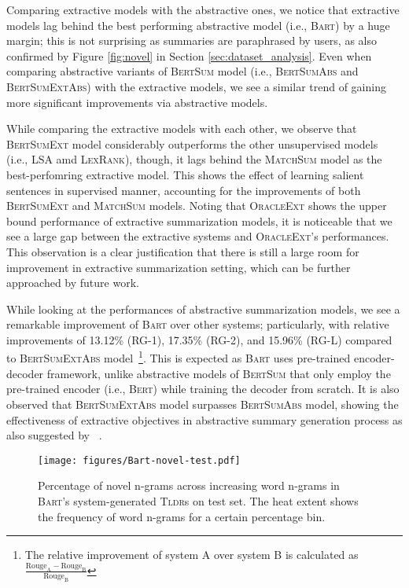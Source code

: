 \documentclass[10pt, a4paper]{article}
\newcommand{\bart}{\textsc{Bart}}
\newcommand{\tldr}{\textsc{Tldr}}
\begin{document}
Comparing extractive models with the abstractive ones, we notice that extractive models lag behind the best performing abstractive model (i.e., \bart) by a huge margin;
this is not surprising as summaries are paraphrased by users, 
as also confirmed by Figure \ref{fig:novel} in Section \ref{sec:dataset_analysis}.  Even when comparing abstractive variants of \textsc{BertSum} model (i.e., \textsc{BertSumAbs} and \textsc{BertSumExtAbs}) with the extractive models, we see a similar trend of gaining more significant improvements via abstractive models. 

While comparing the extractive models with each other, we observe that \textsc{BertSumExt} model considerably outperforms the other unsupervised models (i.e., \textsc{LSA} amd \textsc{LexRank}), though, it lags behind the \textsc{MatchSum} model as the best-perfomring extractive model. This shows the effect of learning salient sentences in supervised manner, accounting for the improvements of both \textsc{BertSumExt} and \textsc{MatchSum} models. Noting that \textsc{OracleExt}
shows the upper bound performance of extractive summarization models, it is noticeable that we see a large gap between the extractive systems and \textsc{OracleExt}'s performances. This observation is a clear justification that there is still a large room for improvement in extractive summarization setting, which can be further approached by future work.

While looking at the performances of abstractive summarization models, we see a remarkable improvement of \bart{} over other systems; particularly, with relative improvements of 13.12\% (RG-1), 17.35\% (RG-2), and 15.96\% (RG-L) compared to \textsc{BertSumExtAbs} model~\footnote{The relative improvement of system A over system B is calculated as $\frac{\text{Rouge}_{\text{A}} - \text{Rouge}_{\text{B}}}{\text{Rouge}_{\text{B}}}$}. This is expected as \bart{} uses pre-trained encoder-decoder framework, unlike abstractive models of \textsc{BertSum} that only employ the pre-trained encoder (i.e., \textsc{Bert}) while training the decoder from scratch. It is also observed that \textsc{BertSumExtAbs} model surpasses \textsc{BertSumAbs} model, showing the effectiveness of extractive objectives in abstractive summary generation process as also suggested by ~. 


\begin{figure}
    \centering
    \texttt{[image: figures/Bart-novel-test.pdf]}
    \caption{Percentage of novel n-grams across increasing word n-grams in \bart 's system-generated \tldr s on test set. The heat extent shows the frequency of word n-grams for a certain percentage bin.}
    \label{fig:bart-ngrams}
\end{figure}
\end{document}
